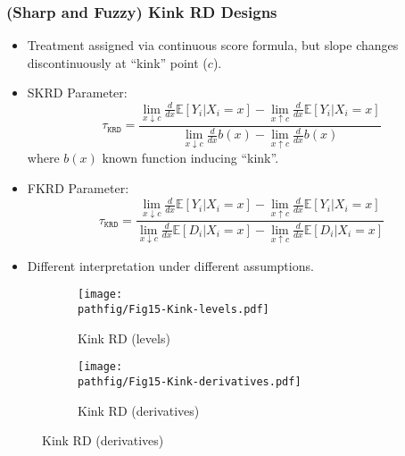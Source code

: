 \documentclass[9pt]{beamer}
\newcommand{\E}{\mathbb{E}}
\renewcommand{\c}{c}
\newcommand{\pathfig}{figures}
\begin{document}
\begin{frame}\frametitle{(Sharp and Fuzzy) Kink RD Designs}
	\begin{itemize}
		\item Treatment assigned via continuous score formula, but slope changes discontinuously at ``kink'' point ($\c$).\bigskip
		\item SKRD Parameter:
		\[\tau_{\mathtt{KRD}}=\frac{\lim_{x\downarrow\c}\frac{d}{dx}\E[Y_{i}|X_{i}=x]-\lim_{x\uparrow\c}\frac{d}{dx}\E[Y_{i}|X_{i}=x]}
		                           {\lim_{x\downarrow\c}\frac{d}{dx}b(x)-\lim_{x\uparrow\c}\frac{d}{dx}b(x)}
		\]
		where $b(x)$ known function inducing ``kink''.\bigskip
		
		\item FKRD Parameter:
		\[\tau_{\mathtt{KRD}}=\frac{\lim_{x\downarrow\c}\frac{d}{dx}\E[Y_{i}|X_{i}=x]-\lim_{x\uparrow\c}\frac{d}{dx}\E[Y_{i}|X_{i}=x]}
		                           {\lim_{x\downarrow\c}\frac{d}{dx}\E[D_{i}|X_{i}=x]-\lim_{x\uparrow\c}\frac{d}{dx}\E[D_{i}|X_{i}=x]}
		\]
		\smallskip
		
		\item Different interpretation under different assumptions.
	\end{itemize}
\end{frame}

\begin{frame}
	\begin{figure}[h]
		\begin{subfigure}[t]{0.47\textwidth}
			\centering
			\texttt{[image: \\pathfig/Fig15-Kink-levels.pdf]}
			\caption{Kink RD (levels)}       
		\end{subfigure}
		\hspace{0.1in}
		\begin{subfigure}[t]{0.47\textwidth}
			\centering
			\texttt{[image: \\pathfig/Fig15-Kink-derivatives.pdf]}
			\caption{Kink RD (derivatives)}
		\end{subfigure}
	\end{figure}
\end{frame}
\end{document}
